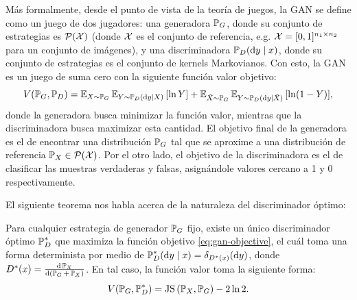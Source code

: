{{{Más formalmente, desde el punto de vista de la teoría de juegos, la GAN se define como un juego de dos jugadores: una generadora $\Prob_G$, donde su conjunto de estrategias es $\ProbSpace[\cX]$ (donde $\cX$ es el conjunto de referencia, e.g. $\cX=[0, 1]^{n_1\times n_2}$ para un conjunto de imágenes), y una discriminadora $\Prob_D(\dd y \mid x)$, donde su conjunto de estrategias es el conjunto de kernels Markovianos. Con esto, la GAN es un juego de suma cero con la siguiente función valor objetivo:
\begin{equation}
    \label{eq:gan-objective}
    V(\Prob_G, \Prob_D)
    = \Exp_{X\sim\Prob_G}{\Exp_{Y \sim \Prob_D(\dd y \mid X)} \left[ \ln Y \right]}
    + \Exp_{\tilde X\sim\Prob_G}{\Exp_{Y \sim \Prob_D(\dd y \mid \tilde X)} \left[ \ln (1 - Y) \right]},
\end{equation}
donde la generadora busca minimizar la función valor, mientras que la discriminadora busca maximizar esta cantidad. El objetivo final de la generadora es el de encontrar una distribución $\Prob_G$ tal que se aproxime a una distribución de referencia $\Prob_X \in \ProbSpace[\cX] $. Por el otro lado, el objetivo de la discriminadora es el de clasificar las muestras verdaderas y falsas, asignándole valores cercano a 1 y 0 respectivamente.


El siguiente teorema nos habla acerca de la naturaleza del discriminador óptimo:

\begin{theorem}
    \label{thm:gan-optimal-discriminator}
    Para cualquier estrategia de generador $\Prob_G$ fijo, existe un único discriminador óptimo $\Prob_D^\ast$ que maximiza la función objetivo \eqref{eq:gan-objective}, el cuál toma una forma determinista por medio de $\Prob_D^\ast(\dd y \mid x) = \delta_{D^\ast(x)}(\dd y)$, donde $D^\ast(x) = \dv{\Prob_X}{(\Prob_G+\Prob_X)}$. En tal caso, la función valor toma la siguiente forma:
    \begin{equation}
        V(\Prob_G, \Prob_D^\ast) = \JS{\Prob_X}{\Prob_G} - 2 \ln 2.
    \end{equation}
\end{theorem}

}}}
